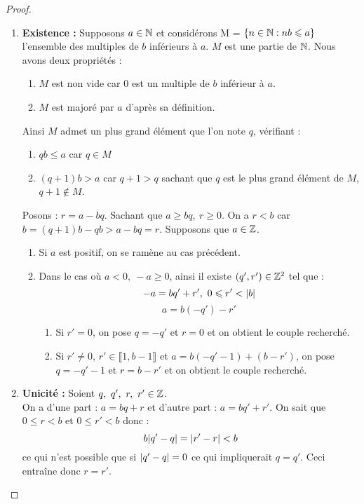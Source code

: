 \begin{proof}\cite{livre_prepa}
	\begin{enumerate}
		\item \textbf{Existence :} Supposons $a \in \mathbb{N}$ et considérons M = $\{n \in \mathbb{N} : nb \leqslant a\}$ l'ensemble des multiples de $b$ inférieurs à $a$. $M$ est une partie de $\mathbb{N}$. Nous avons deux propriétés : 
		\begin{enumerate}
			\item $M$ est non vide car 0 est un multiple de $b$ inférieur à $a$.
			\item $M$ est majoré par $a$ d'après sa définition.
		\end{enumerate}
		Ainsi $M$ admet un plus grand élément que l'on note $q$, vérifiant :
		\begin{enumerate}
			\item $qb \leq a$ car $q \in M$ 
			\item $(q + 1)b > a$ car $q + 1 > q$ sachant que $q$ est le plus grand élément de $M$, $q + 1 \notin M$.
		\end{enumerate}
		Posons : $r = a - bq$. Sachant que $a \geq bq,\ r \geq 0$. On a $r < b$ car $b = (q + 1)b - qb > a - bq = r$. Supposons que $a \in \mathbb{Z}$. 
		\begin{enumerate}
			\item Si $a$ est positif, on se ramène au cas précédent.
			\item Dans le cas où $a < 0,\ -a \geq 0$, ainsi il existe $(q', r') \in \mathbb{Z}^2$ tel que :
		\[ -a = bq' + r',\ 0 \leqslant r' < \abs{b} \]
		\[a = b(-q') - r' \]
			\begin{enumerate}
				\item Si $r' = 0$, on pose $q = -q'$ et $r = 0$ et on obtient le couple recherché.
				\item Si $r' \neq 0$, $r' \in \llbracket 1, b-1 \rrbracket$ et $a = b(-q' -1) + (b - r')$, on pose $q = -q' - 1$ et $r = b - r'$ et on obtient le couple recherché. 
			\end{enumerate}
		\end{enumerate}
		\item \textbf{Unicité :} Soient $q,\ q',\ r,\ r' \in \Z$. \\
	On a d'une part : $a = bq + r$ et d'autre part : $a = bq' + r'$.
	On sait que $0 \leq r < b$ et $0 \leq r' < b$ donc :
	\[ b \abs{q' - q} = \abs{r' - r} < b \]
	ce qui n'est possible que si $\abs{q' - q} = 0$ ce qui impliquerait $q = q'$. Ceci entraîne donc $r = r'$.
	\end{enumerate}
\end{proof}

